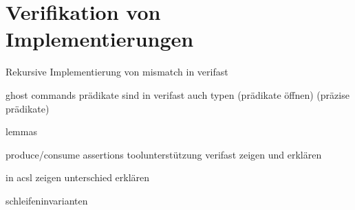 \section{Verifikation von Implementierungen}

Rekursive Implementierung von mismatch
in verifast

ghost commands
prädikate sind in verifast auch typen
(prädikate öffnen)
(präzise prädikate)


lemmas

produce/consume assertions
toolunterstützung verifast zeigen und erklären


in acsl zeigen
unterschied erklären


schleifeninvarianten


